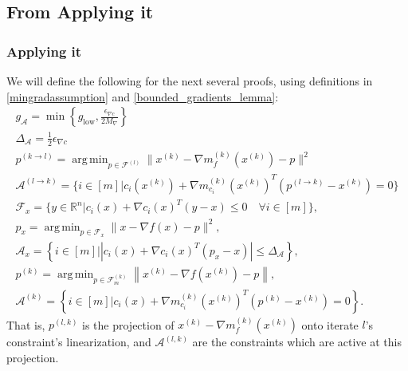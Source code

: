 \documentclass{article}
\newtheorem{lemma}[theorem]{Lemma}
\theoremstyle{case}
\numberwithin{theorem}{subsection}
\DeclareMathOperator*{\argmin}{arg\,min}
\newcommand{\feasiblek}{{\mathcal F_m^{(k)}}}
\newcommand{\gk}{{\nabla m_f^{(k)}\left(\xk\right)}}
\newcommand{\gmcik}{{\nabla m_{c_i}^{(k)}\left(\xk\right)}}
\newcommand{\gradf}{\nabla f}
\newcommand{\maxgrad}{{M_{\nabla}}}
\newcommand{\minactivegraddelta}{{\Delta_{\mathcal A}}}
\newcommand{\minactivegrad}{{ g_{\mathcal A} }}
\newcommand{\mingradepsilon}{{\epsilon_{\nabla c}}}
\newcommand{\mingrad}{{ g_{\textrm{low}} }}
\newcommand{\Rn}{\mathbb R^n}
\newcommand{\xk}{x^{(k)}}
\begin{document}
\color{black}


% 




\subsection{From Applying it}


\subsubsection{Applying it}
\color{red}
We will define the following for the next several proofs, using definitions in \cref{mingradassumption} and \cref{bounded_gradients_lemma}:
\begin{align}
\minactivegrad = \min\left\{\mingrad, \frac {\mingradepsilon} {2 \maxgrad}  \right\} \label{define_minactivegrad_orig} \\
\minactivegraddelta = \frac 1 2 \mingradepsilon \label{define_minactivedelta_orig} \\
p^{(k \to l)} = \argmin_{p \in \mathcal F^{(l)}} \|\xk - \gk - p\|^2 \label{bp_define_plk_orig} \\
\mathcal A^{(l \to k)} = \{i \in [m] | c_i(\xk) + \gmcik^T(p^{(l\to k)} - \xk) = 0 \} \label{bp_define_activep} \\
\mathcal F_x = \{ y \in \Rn | c_i(x) + \nabla c_i(x)^T(y - x) \le 0 \quad \forall i \in [m]\}, \label{bp_define_true_linearization} \\
p_x = \argmin_{p \in \mathcal F_x} \|x - \gradf(x) - p\|^2, \label{bp_define_true_projection} \\
\mathcal A_x = \left\{i \in [m] | \left|c_i(x) + \nabla c_i(x)^T(p_x - x)\right| \le \minactivegraddelta \right\}, \label{define_projection_active} \\
p^{(k)} = \argmin_{p \in \feasiblek} \left\| \xk - \nabla f\left(\xk\right) - p \right\|, \label{bp_define_pl} \\
\mathcal A^{(k)} = \left\{i \in [m] | c_i(x) + \gmcik^T\left(p^{(k)} - \xk\right) = 0 \right\}. \label{bp_define_yet_another_thing}
\end{align}
That is, $p^{(l, k)}$ is the projection of $\xk - \gk$ onto iterate $l$'s constraint's linearization,
and $\mathcal A^{(l, k)}$ are the constraints which are active at this projection.
\end{document}
